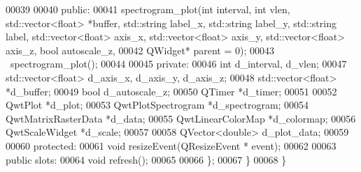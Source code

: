 \begin{DoxyCode}
00039 
00040         \textcolor{keyword}{public}:
00041             spectrogram_plot(\textcolor{keywordtype}{int} interval, \textcolor{keywordtype}{int} vlen, std::vector<float> *buffer, 
      std::string label\_x, std::string label\_y, std::string label, std::vector<float> axis\_x, std::vector<float> 
      axis\_y, std::vector<float> axis\_z, \textcolor{keywordtype}{bool} autoscale\_z,
00042             QWidget* parent = 0);
00043             ~spectrogram_plot();
00044             
00045         \textcolor{keyword}{private}:
00046             \textcolor{keywordtype}{int} d_interval, d_vlen;
00047             std::vector<float> d_axis_x, d_axis_y, d_axis_z;
00048             std::vector<float> *d_buffer;
00049             \textcolor{keywordtype}{bool} d_autoscale_z;
00050             QTimer *d_timer;
00051             
00052             QwtPlot *d_plot;
00053             QwtPlotSpectrogram *d_spectrogram;
00054             QwtMatrixRasterData *d_data;
00055             QwtLinearColorMap *d_colormap;
00056             QwtScaleWidget *d_scale;
00057             
00058             QVector<double> d_plot_data;
00059             
00060         \textcolor{keyword}{protected}:
00061             \textcolor{keywordtype}{void} resizeEvent(QResizeEvent * event);
00062             
00063         \textcolor{keyword}{public} slots:
00064             \textcolor{keywordtype}{void} refresh();
00065             
00066         \};
00067     \}
00068 \}
\end{DoxyCode}
